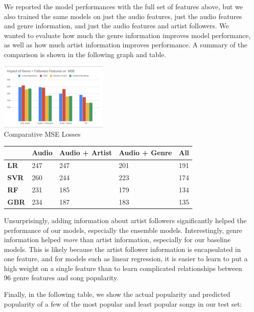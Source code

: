 \documentclass[journal]{IEEEtran}
\begin{document}
We reported the model performances with the full set of features above, but we also trained the same models on just the audio features, just the audio features and genre information, and just the audio features and artist followers. We wanted to evaluate how much the genre information improves model performance, as well as how much artist information improves performance. A summary of the comparison is shown in the following graph and table.

\begin{center}
\includegraphics[width = 0.4\textwidth]{images/221_model_comparison.png} \\

\caption{Comparative MSE Losses}
\centering
\label{my-label}
\begin{tabular}{|l|l|l|l|l|}
\hline
\textbf{} & Audio  & Audio + Artist  & Audio + Genre  & All    \\ \hline
\textbf{LR}   & 247 & 247 & 201 & 191 \\ \hline
\textbf{SVR}   & 260 & 244 & 223 & 174 \\ \hline
\textbf{RF}   & 231 & 185 & 179 & 134 \\ \hline
\textbf{GBR}   & 234 & 187 & 183 & 135 \\ \hline
\end{tabular}
\end{center}

\quad\newline
Unsurprisingly, adding information about artist followers significantly helped the performance of our models, especially the ensemble models. Interestingly, genre information helped \textit{more} than artist information, especially for our baseline models. This is likely because the artist follower information is encapsulated in one feature, and for models such as linear regression, it is easier to learn to put a high weight on a single feature than to learn complicated relationships between 96 genre features and song popularity.

Finally, in the following table, we show the actual popularity and predicted popularity of a few of the most popular and least popular songs in our test set:
\end{document}
